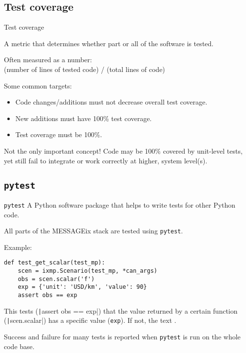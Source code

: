 \documentclass[12pt,aspectratio=169]{beamer}
\begin{document}
\subsection{Test coverage}
\begin{frame}{Test coverage}

A metric that determines whether part or all of the software is tested.

\bigskip
Often measured as a number:\\
(number of lines of tested code) / (total lines of code)

\bigskip
Some common targets:
\begin{itemize}
  \item Code changes/additions must not decrease overall test coverage.
  \item New additions must have 100\% test coverage.
  \item Test coverage must be 100\%.
\end{itemize}

\bigskip
Not the only important concept!
Code may be 100\% covered by unit-level tests, yet still fail to integrate or work correctly at higher, system level(s).

\end{frame}

\subsection{\texttt{pytest}}
\begin{frame}[fragile]{\texttt{pytest}}
A Python software package that helps to write tests for other Python code.

All parts of the MESSAGEix stack are tested using \texttt{pytest}.

\medskip
Example:
\begin{verbatim}
def test_get_scalar(test_mp):
    scen = ixmp.Scenario(test_mp, *can_args)
    obs = scen.scalar('f')
    exp = {'unit': 'USD/km', 'value': 90}
    assert obs == exp
\end{verbatim}

This tests (\texttt|assert obs == exp|) that the value returned by a certain function (\texttt|scen.scalar|) has a specific value (\texttt{exp}).
If not, the text .

\medskip
Success and failure for many tests is reported when \texttt{pytest} is run on the whole code base.

\end{frame}
\end{document}
